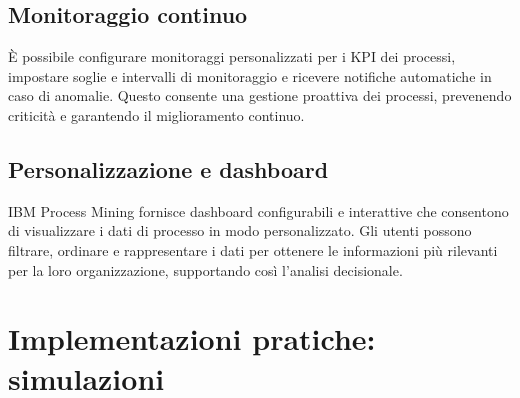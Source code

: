 \documentclass{article}
\begin{document}
\subsection{Monitoraggio continuo}
È possibile configurare monitoraggi personalizzati per i KPI dei processi, impostare soglie e intervalli di monitoraggio e ricevere notifiche automatiche in caso di anomalie. Questo consente una gestione proattiva dei processi, prevenendo criticità e garantendo il miglioramento continuo.

\subsection{Personalizzazione e dashboard}
IBM Process Mining fornisce dashboard configurabili e interattive che consentono di visualizzare i dati di processo in modo personalizzato. Gli utenti possono filtrare, ordinare e rappresentare i dati per ottenere le informazioni più rilevanti per la loro organizzazione, supportando così l'analisi decisionale.

\section{Implementazioni pratiche: simulazioni}
\end{document}
